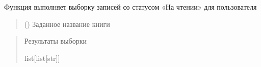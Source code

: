 \documentclass[letterpaper,10pt,russian]{sphinxmanual}
\begin{document}
\begin{fulllineitems}
\begin{description}
\begin{sphinxVerbatim}[commandchars=\\\{\}]
\end{sphinxVerbatim}

\end{description}

\begin{fulllineitems}
\label{\detokenize{database.sqlite3_interface.views:database.sqlite3_interface.views.view_in_read.ViewInRead.select_for_user}}
\pysigstartsignatures
{}
\pysigstopsignatures
\sphinxAtStartPar
Функция выполняет выборку записей со статусом «На чтении» для пользователя
\begin{quote}\begin{description}
\sphinxAtStartPar
{} () \textendash{} Заданное название книги

\end{description}\end{quote}
\begin{description}
\begin{sphinxVerbatim}[commandchars=\\\{\}]
\end{sphinxVerbatim}

\end{description}
\begin{quote}\begin{description}
\sphinxAtStartPar
Результаты выборки

\sphinxAtStartPar
list{[}list{[}str{]}{]}

\end{description}\end{quote}

\end{fulllineitems}


\end{fulllineitems}
\end{document}
